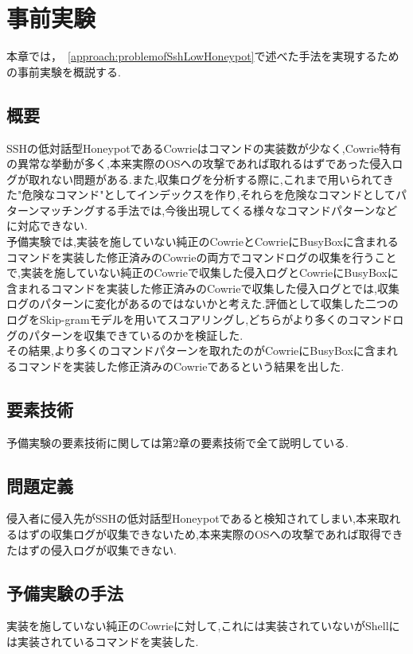 \chapter{事前実験}
\label{prex}

本章では，~\ref{approach:problemofSshLowHoneypot}で述べた手法を実現するための事前実験を概説する.

\section{概要}
\label{prex:abst}
SSHの低対話型HoneypotであるCowrieはコマンドの実装数が少なく,Cowrie特有の異常な挙動が多く,本来実際のOSへの攻撃であれば取れるはずであった侵入ログが取れない問題がある.また,収集ログを分析する際に,これまで用いられてきた"危険なコマンド"としてインデックスを作り,それらを危険なコマンドとしてパターンマッチングする手法では,今後出現してくる様々なコマンドパターンなどに対応できない.\\
予備実験では,実装を施していない純正のCowrieとCowrieにBusyBoxに含まれるコマンドを実装した修正済みのCowrieの両方でコマンドログの収集を行うことで,実装を施していない純正のCowrieで収集した侵入ログとCowrieにBusyBoxに含まれるコマンドを実装した修正済みのCowrieで収集した侵入ログとでは,収集ログのパターンに変化があるのではないかと考えた.評価として収集した二つのログをSkip-gramモデルを用いてスコアリングし,どちらがより多くのコマンドログのパターンを収集できているのかを検証した.\\
その結果,より多くのコマンドパターンを取れたのがCowrieにBusyBoxに含まれるコマンドを実装した修正済みのCowrieであるという結果を出した.

\section{要素技術}
\label{prex:tech}
予備実験の要素技術に関しては第2章の要素技術で全て説明している.

\section{問題定義}
\label{prex:method}
侵入者に侵入先がSSHの低対話型Honeypotであると検知されてしまい,本来取れるはずの収集ログが収集できないため,本来実際のOSへの攻撃であれば取得できたはずの侵入ログが収集できない.

\section{予備実験の手法}
\label{prex:appr}
実装を施していない純正のCowrieに対して,これには実装されていないがShellには実装されているコマンドを実装した.

